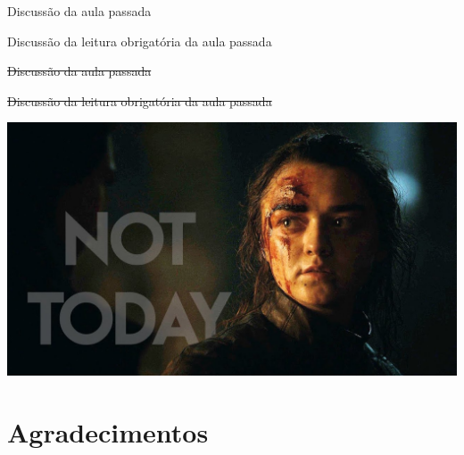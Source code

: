 \documentclass{beamer}
\begin{document}
\begin{frame}{\scriptsize Discussão da aula passada}
  \begin{block}{}
    Discussão da leitura obrigatória da aula passada
  \end{block}
  \begin{center}
    \vfill
  \end{center}
\end{frame}

\begin{frame}{\scriptsize \sout{Discussão da aula passada}}
  \begin{block}{}
    \sout{Discussão da leitura obrigatória da aula passada}
  \end{block}
  \begin{center}
    \vfill
    \includegraphics[height=.5\textheight]{Encerramento/arya-nottoday}
  \end{center}
\end{frame}

\section{Agradecimentos}
\end{document}
